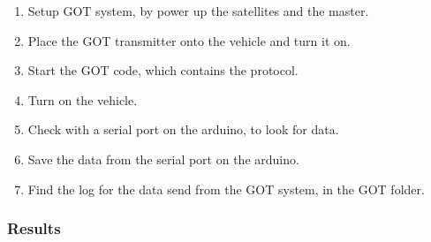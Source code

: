 \begin{enumerate}
  \item Setup GOT system, by power up the satellites and the master.
  \item Place the GOT transmitter onto the vehicle and turn it on.
  \item Start the GOT code, which contains the protocol.
  \item Turn on the vehicle.
  \item Check with a serial port on the arduino, to look for data.
  \item Save the data from the serial port on the arduino.
  \item Find the log for the data send from the GOT system, in the GOT folder.
\end{enumerate}

\subsubsection{Results}

